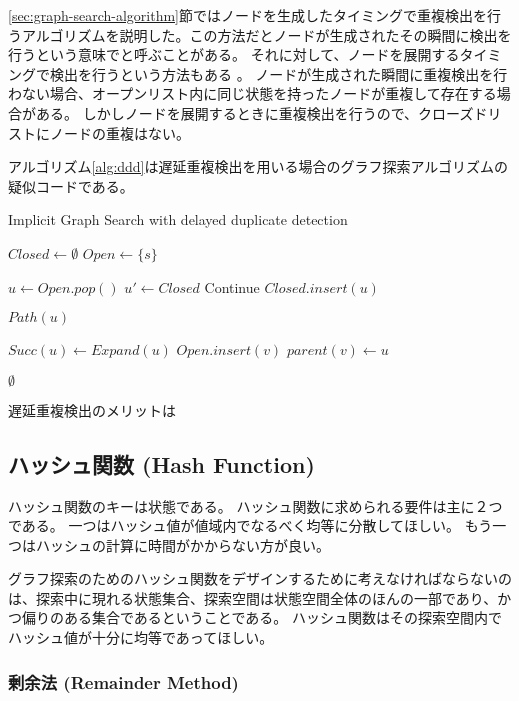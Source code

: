 \ref{sec:graph-search-algorithm}節ではノードを生成したタイミングで重複検出を行うアルゴリズムを説明した。この方法だとノードが生成されたその瞬間に検出を行うという意味でと呼ぶことがある。
それに対して、ノードを展開するタイミングで検出を行うという方法もある \cite{korf2003delayed}。
ノードが生成された瞬間に重複検出を行わない場合、オープンリスト内に同じ状態を持ったノードが重複して存在する場合がある。
しかしノードを展開するときに重複検出を行うので、クローズドリストにノードの重複はない。

アルゴリズム\ref{alg:ddd}は遅延重複検出を用いる場合のグラフ探索アルゴリズムの疑似コードである。

\begin{algorithm}
\caption{Implicit Graph Search with delayed duplicate detection}
\label{alg:ddd}
	$Closed \leftarrow \emptyset$\;
	$Open \leftarrow \{s\}$\;
	 {
		$u \leftarrow Open.pop()$\;
		 {
			$u' \leftarrow Closed$
			Continue\;
		}
		$Closed.insert(u)$\;
		
		 {
			\Return $Path(u)$\;
		}
		
		$Succ(u) \leftarrow Expand(u)$\;
		 {
			$Open.insert(v)$\;
			$parent(v) \leftarrow u$\;
		}
 	}
	\Return $\emptyset$\;
\end{algorithm}


遅延重複検出のメリットは


\subsection{ハッシュ関数 (Hash Function)}
\label{sec:hash-function}

ハッシュ関数のキーは状態である。
ハッシュ関数に求められる要件は主に２つである。
一つはハッシュ値が値域内でなるべく均等に分散してほしい。
もう一つはハッシュの計算に時間がかからない方が良い。

グラフ探索のためのハッシュ関数をデザインするために考えなければならないのは、探索中に現れる状態集合、探索空間は状態空間全体のほんの一部であり、かつ偏りのある集合であるということである。
ハッシュ関数はその探索空間内でハッシュ値が十分に均等であってほしい。


\subsubsection{剰余法 (Remainder Method)}

